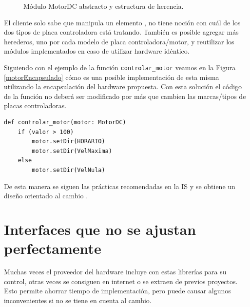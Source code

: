 \begin{figure}[H]
\caption{Módulo MotorDC abstracto y estructura de herencia.}
\label{estructuraHerencia}
\begin{center}
\end{center}
\end{figure}

El cliente solo sabe que manipula un elemento \textit{\MotorDC}, no tiene noción con cuál de los dos tipos de placa controladora está tratando. También es posible agregar más herederos, uno por cada modelo de placa controladora/motor, y reutilizar los módulos implementados en caso de utilizar hardware idéntico.

Siguiendo con el ejemplo de la función \verb|controlar_motor| veamos en la Figura \ref{motorEncapsulado} cómo es una posible implementación de esta misma utilizando la encapsulación del hardware propuesta. Con esta solución el código de la función no deberá ser modificado por más que cambien las marcas/tipos de placas controladoras.

\begin{lstlisting}[caption=Implementación de la función controlar\_motor utilizando encapsulación del hardware.,label={motorEncapsulado}]
def controlar_motor(motor: MotorDC)
	if (valor > 100)
		motor.setDir(HORARIO)
		motor.setDir(VelMaxima)
	else
		motor.setDir(VelNula)
\end{lstlisting}

De esta manera se siguen las prácticas recomendadas en la \gls{IS} \cite{ShawGarlan1996, ghezzi2003, bass2003, DBLP:books/daglib/0030743} y se obtiene un diseño orientado al cambio \cite{Gamma:1995:DPE:186897}.

\section{Interfaces que no se ajustan perfectamente}
Muchas veces el proveedor del hardware incluye con estas librerías para su control, otras veces se consiguen en internet o se extraen de previos proyectos. Esto permite ahorrar tiempo de implementación, pero puede causar algunos inconvenientes si no se tiene en cuenta al cambio.

